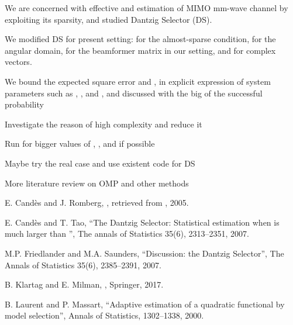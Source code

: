 {
\I We are concerned with effective and estimation of MIMO mm-wave channel by exploiting its sparsity, and studied Dantzig Selector (DS).

\I We modified DS for present setting: for the almost-sparse condition, for the angular domain, for the beamformer matrix  in our setting, and for complex vectors.

\I We bound the expected square error and , in explicit expression of system parameters such as , , and , and discussed with the big  of the successful probability
}
{
\I Investigate the reason of high complexity and reduce it

\I Run for bigger values of , , and  if possible

\I Maybe try the real case and use existent code for DS

\I More literature review on OMP and other methods
}
{
{\tfx
\I E. Candès and J. Romberg, , retrieved from , 2005.

\I E. Candès and T. Tao, ``The Dantzig Selector: Statistical estimation when  is much larger than '', The annals of Statistics 35(6), 2313–2351, 2007.

\I M.P. Friedlander and M.A. Saunders, ``Discussion: the Dantzig Selector'', The Annals of Statistics 35(6), 2385–2391, 2007.

\I B. Klartag and E. Milman, , Springer, 2017.

\I B. Laurent and P. Massart, ``Adaptive estimation of a quadratic functional by model selection'', Annals of Statistics, 1302–1338, 2000.
}
}

